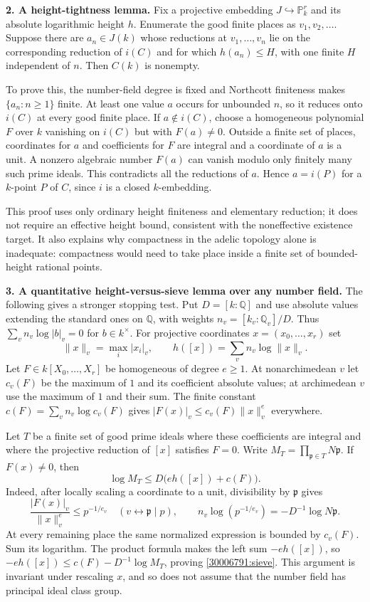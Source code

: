 \documentclass[11pt,a4paper]{article}
\newcommand{\Q}{\mathbb{Q}}
\newcommand{\PP}{\mathbb P}
\begin{document}
\textbf{2. A height-tightness lemma.}
Fix a projective embedding $J\hookrightarrow\PP^r_k$ and its absolute
logarithmic height $h$. Enumerate the good finite places as
$v_1,v_2,\ldots$. Suppose there are $a_n\in J(k)$ whose reductions at
$v_1,\ldots,v_n$ lie on the corresponding reduction of $i(C)$ and for
which $h(a_n)\le H$, with one finite $H$ independent of $n$. Then $C(k)$
is nonempty.

To prove this, the number-field degree is fixed and Northcott finiteness
makes $\{a_n:n\ge1\}$ finite. At least one value $a$ occurs for unbounded
$n$, so it reduces onto $i(C)$ at every good finite place. If
$a\notin i(C)$, choose a homogeneous polynomial $F$ over $k$ vanishing
on $i(C)$ but with $F(a)\ne0$. Outside a finite set of places, coordinates
for $a$ and coefficients for $F$ are integral and a coordinate of $a$ is
a unit. A nonzero algebraic number $F(a)$ can vanish modulo only finitely
many such prime ideals. This contradicts all the reductions of $a$.
Hence $a=i(P)$ for a $k$-point $P$ of $C$, since $i$ is a closed
$k$-embedding.

This proof uses only ordinary height finiteness and elementary reduction;
it does not require an effective height bound, consistent with the
noneffective existence target. It also explains why compactness in the
adelic topology alone is inadequate: compactness would need to take place
inside a finite set of bounded-height rational points.

\textbf{3. A quantitative height-versus-sieve lemma over any number field.}
The following gives a stronger stopping test. Put $D=[k:\Q]$ and use
absolute values extending the standard ones on $\Q$, with weights
$n_v=[k_v:\Q_v]/D$. Thus $\sum_v n_v\log|b|_v=0$ for $b\in k^\times$.
For projective coordinates $x=(x_0,\ldots,x_r)$ set
\[
 \|x\|_v=\max_i|x_i|_v,\qquad h([x])=\sum_v n_v\log\|x\|_v.
\]
Let $F\in k[X_0,\ldots,X_r]$ be homogeneous of degree $e\ge1$.
At nonarchimedean $v$ let $c_v(F)$ be the maximum of $1$ and its coefficient
absolute values; at archimedean $v$ use the maximum of $1$ and their sum.
The finite constant
$c(F)=\sum_v n_v\log c_v(F)$ gives
$|F(x)|_v\le c_v(F)\|x\|_v^e$ everywhere.

Let $T$ be a finite set of good prime ideals where these coefficients are
integral and where the projective reduction of $[x]$ satisfies $F=0$.
Write $M_T=\prod_{\mathfrak p\in T}N\mathfrak p$. If $F(x)\ne0$, then
\begin{equation}\label{30006791:sieve}
 \log M_T\le D\bigl(eh([x])+c(F)\bigr).
\end{equation}
Indeed, after locally scaling a coordinate to a unit, divisibility by
$\mathfrak p$ gives
\[
 \frac{|F(x)|_v}{\|x\|_v^e}\le p^{-1/e_v}
 \quad(v\leftrightarrow\mathfrak p\mid p),
 \qquad
 n_v\log(p^{-1/e_v})=-D^{-1}\log N\mathfrak p.
\]
At every remaining place the same normalized expression is bounded by
$c_v(F)$. Sum its logarithm. The product formula makes the left sum
$-eh([x])$, so
$-eh([x])\le c(F)-D^{-1}\log M_T$, proving \eqref{30006791:sieve}.
This argument is invariant under rescaling $x$, and so does not assume
that the number field has principal ideal class group.
\end{document}
